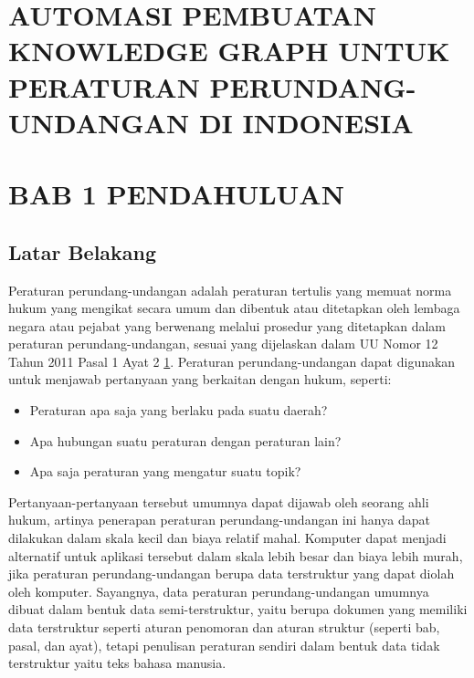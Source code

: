 \section{AUTOMASI PEMBUATAN KNOWLEDGE GRAPH UNTUK PERATURAN
PERUNDANG-UNDANGAN DI
INDONESIA}\label{automasi-pembuatan-knowledge-graph-untuk-peraturan-perundang-undangan-di-indonesia}

\section{BAB 1 PENDAHULUAN}\label{bab-1-pendahuluan}

\subsection{Latar Belakang}\label{latar-belakang}

Peraturan perundang-undangan adalah peraturan tertulis yang memuat norma
hukum yang mengikat secara umum dan dibentuk atau ditetapkan oleh
lembaga negara atau pejabat yang berwenang melalui prosedur yang
ditetapkan dalam peraturan perundang-undangan, sesuai yang dijelaskan
dalam UU Nomor 12 Tahun 2011 Pasal 1 Ayat 2
\href{https://www.pustaka.ut.ac.id/lib/wp-content/uploads/pdfmk/HKUM4403-M1.pdf}{1}.
Peraturan perundang-undangan dapat digunakan untuk menjawab pertanyaan
yang berkaitan dengan hukum, seperti:

\begin{itemize}
\itemsep1pt\parskip0pt
\item
  Peraturan apa saja yang berlaku pada suatu daerah?
\item
  Apa hubungan suatu peraturan dengan peraturan lain?
\item
  Apa saja peraturan yang mengatur suatu topik?
\end{itemize}

Pertanyaan-pertanyaan tersebut umumnya dapat dijawab oleh seorang ahli
hukum, artinya penerapan peraturan perundang-undangan ini hanya dapat
dilakukan dalam skala kecil dan biaya relatif mahal. Komputer dapat
menjadi alternatif untuk aplikasi tersebut dalam skala lebih besar dan
biaya lebih murah, jika peraturan perundang-undangan berupa data
terstruktur yang dapat diolah oleh komputer. Sayangnya, data peraturan
perundang-undangan umumnya dibuat dalam bentuk data semi-terstruktur,
yaitu berupa dokumen yang memiliki data terstruktur seperti aturan
penomoran dan aturan struktur (seperti bab, pasal, dan ayat), tetapi
penulisan peraturan sendiri dalam bentuk data tidak terstruktur yaitu
teks bahasa manusia.


